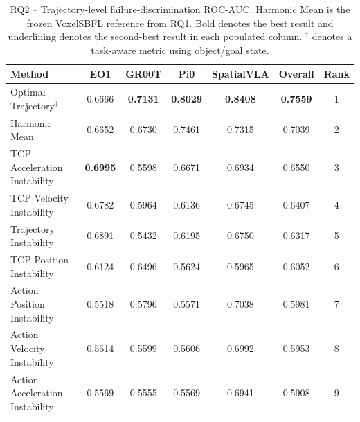 \begin{table}[t]
\centering
\caption{RQ2 -- Trajectory-level failure-discrimination ROC-AUC. Harmonic Mean is the frozen VoxelSBFL reference from RQ1. Bold denotes the best result and underlining denotes the second-best result in each populated column. $^{\dagger}$ denotes a task-aware metric using object/goal state.}
\label{tab:rq2-baseline-performance}
{\scriptsize
\setlength{\tabcolsep}{4pt}
\begin{tabular}{lcccccc}
\toprule
Method & EO1 & GR00T & Pi0 & SpatialVLA & Overall & Rank \\
\midrule
Optimal Trajectory$^{\dagger}$ & 0.6666 & \textbf{0.7131} & \textbf{0.8029} & \textbf{0.8408} & \textbf{0.7559} & 1 \\
Harmonic Mean & 0.6652 & \underline{0.6730} & \underline{0.7461} & \underline{0.7315} & \underline{0.7039} & 2 \\
TCP Acceleration Instability & \textbf{0.6995} & 0.5598 & 0.6671 & 0.6934 & 0.6550 & 3 \\
TCP Velocity Instability & 0.6782 & 0.5964 & 0.6136 & 0.6745 & 0.6407 & 4 \\
Trajectory Instability & \underline{0.6891} & 0.5432 & 0.6195 & 0.6750 & 0.6317 & 5 \\
TCP Position Instability & 0.6124 & 0.6496 & 0.5624 & 0.5965 & 0.6052 & 6 \\
Action Position Instability & 0.5518 & 0.5796 & 0.5571 & 0.7038 & 0.5981 & 7 \\
Action Velocity Instability & 0.5614 & 0.5599 & 0.5606 & 0.6992 & 0.5953 & 8 \\
Action Acceleration Instability & 0.5569 & 0.5555 & 0.5569 & 0.6941 & 0.5908 & 9 \\
\bottomrule
\end{tabular}
}
\end{table}
